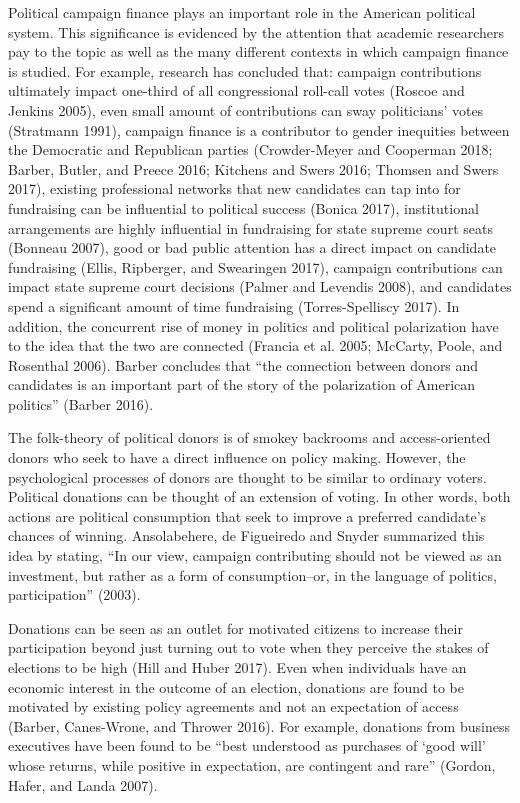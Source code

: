 \documentclass[12pt,]{article}
\begin{document}
\vskip -8.5pt



\noindent \doublespacing 

Political campaign finance plays an important role in the American
political system. This significance is evidenced by the attention that
academic researchers pay to the topic as well as the many different
contexts in which campaign finance is studied. For example, research has
concluded that: campaign contributions ultimately impact one-third of
all congressional roll-call votes (Roscoe and Jenkins 2005), even small
amount of contributions can sway politicians' votes (Stratmann 1991),
campaign finance is a contributor to gender inequities between the
Democratic and Republican parties (Crowder-Meyer and Cooperman 2018;
Barber, Butler, and Preece 2016; Kitchens and Swers 2016; Thomsen and
Swers 2017), existing professional networks that new candidates can tap
into for fundraising can be influential to political success (Bonica
2017), institutional arrangements are highly influential in fundraising
for state supreme court seats (Bonneau 2007), good or bad public
attention has a direct impact on candidate fundraising (Ellis,
Ripberger, and Swearingen 2017), campaign contributions can impact state
supreme court decisions (Palmer and Levendis 2008), and candidates spend
a significant amount of time fundraising (Torres-Spelliscy 2017). In
addition, the concurrent rise of money in politics and political
polarization have to the idea that the two are connected (Francia et al.
2005; McCarty, Poole, and Rosenthal 2006). Barber concludes that ``the
connection between donors and candidates is an important part of the
story of the polarization of American politics'' (Barber 2016).

The folk-theory of political donors is of smokey backrooms and
access-oriented donors who seek to have a direct influence on policy
making. However, the psychological processes of donors are thought to be
similar to ordinary voters. Political donations can be thought of an
extension of voting. In other words, both actions are political
consumption that seek to improve a preferred candidate's chances of
winning. Ansolabehere, de Figueiredo and Snyder summarized this idea by
stating, ``In our view, campaign contributing should not be viewed as an
investment, but rather as a form of consumption--or, in the language of
politics, participation'' (2003).

Donations can be seen as an outlet for motivated citizens to increase
their participation beyond just turning out to vote when they perceive
the stakes of elections to be high (Hill and Huber 2017). Even when
individuals have an economic interest in the outcome of an election,
donations are found to be motivated by existing policy agreements and
not an expectation of access (Barber, Canes-Wrone, and Thrower 2016).
For example, donations from business executives have been found to be
``best understood as purchases of `good will' whose returns, while
positive in expectation, are contingent and rare'' (Gordon, Hafer, and
Landa 2007).
\end{document}
